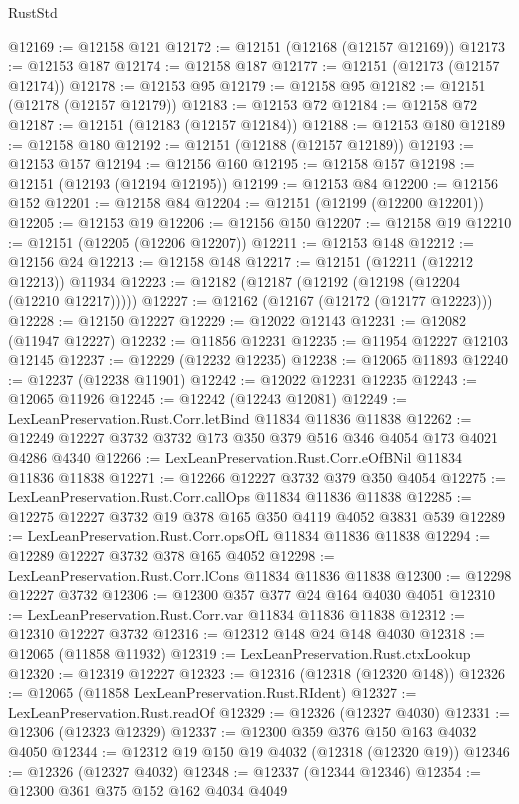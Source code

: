 \begin{lexlean}{RustStd}
\begin{coremodule}
@12169 := @12158 @121
@12172 := @12151 (@12168 (@12157 @12169))
@12173 := @12153 @187
@12174 := @12158 @187
@12177 := @12151 (@12173 (@12157 @12174))
@12178 := @12153 @95
@12179 := @12158 @95
@12182 := @12151 (@12178 (@12157 @12179))
@12183 := @12153 @72
@12184 := @12158 @72
@12187 := @12151 (@12183 (@12157 @12184))
@12188 := @12153 @180
@12189 := @12158 @180
@12192 := @12151 (@12188 (@12157 @12189))
@12193 := @12153 @157
@12194 := @12156 @160
@12195 := @12158 @157
@12198 := @12151 (@12193 (@12194 @12195))
@12199 := @12153 @84
@12200 := @12156 @152
@12201 := @12158 @84
@12204 := @12151 (@12199 (@12200 @12201))
@12205 := @12153 @19
@12206 := @12156 @150
@12207 := @12158 @19
@12210 := @12151 (@12205 (@12206 @12207))
@12211 := @12153 @148
@12212 := @12156 @24
@12213 := @12158 @148
@12217 := @12151 (@12211 (@12212 @12213)) @11934
@12223 := @12182 (@12187 (@12192 (@12198 (@12204 (@12210 @12217)))))
@12227 := @12162 (@12167 (@12172 (@12177 @12223)))
@12228 := @12150 @12227
@12229 := @12022 @12143
@12231 := @12082 (@11947 @12227)
@12232 := @11856 @12231
@12235 := @11954 @12227 @12103 @12145
@12237 := @12229 (@12232 @12235)
@12238 := @12065 @11893
@12240 := @12237 (@12238 @11901)
@12242 := @12022 @12231 @12235
@12243 := @12065 @11926
@12245 := @12242 (@12243 @12081)
@12249 := LexLeanPreservation.Rust.Corr.letBind @11834 @11836 @11838
@12262 := @12249 @12227 @3732 @3732 @173 @350 @379 @516 @346 @4054 @173 @4021 @4286 @4340
@12266 := LexLeanPreservation.Rust.Corr.eOfBNil @11834 @11836 @11838
@12271 := @12266 @12227 @3732 @379 @350 @4054
@12275 := LexLeanPreservation.Rust.Corr.callOps @11834 @11836 @11838
@12285 := @12275 @12227 @3732 @19 @378 @165 @350 @4119 @4052 @3831 @539
@12289 := LexLeanPreservation.Rust.Corr.opsOfL @11834 @11836 @11838
@12294 := @12289 @12227 @3732 @378 @165 @4052
@12298 := LexLeanPreservation.Rust.Corr.lCons @11834 @11836 @11838
@12300 := @12298 @12227 @3732
@12306 := @12300 @357 @377 @24 @164 @4030 @4051
@12310 := LexLeanPreservation.Rust.Corr.var @11834 @11836 @11838
@12312 := @12310 @12227 @3732
@12316 := @12312 @148 @24 @148 @4030
@12318 := @12065 (@11858 @11932)
@12319 := LexLeanPreservation.Rust.ctxLookup
@12320 := @12319 @12227
@12323 := @12316 (@12318 (@12320 @148))
@12326 := @12065 (@11858 LexLeanPreservation.Rust.RIdent)
@12327 := LexLeanPreservation.Rust.readOf
@12329 := @12326 (@12327 @4030)
@12331 := @12306 (@12323 @12329)
@12337 := @12300 @359 @376 @150 @163 @4032 @4050
@12344 := @12312 @19 @150 @19 @4032 (@12318 (@12320 @19))
@12346 := @12326 (@12327 @4032)
@12348 := @12337 (@12344 @12346)
@12354 := @12300 @361 @375 @152 @162 @4034 @4049

\end{coremodule}
\end{lexlean}
